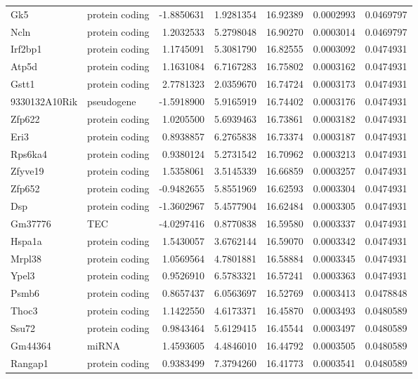 \documentclass[onehalf,12pt]{beavtex}
\begin{document}
\begin{longtable}{llrrrrr}
  Gk5 & protein coding & -1.8850631 & 1.9281354 & 16.92389 & 0.0002993 & 0.0469797\\
  Ncln & protein coding & 1.2032533 & 5.2798048 & 16.90270 & 0.0003014 & 0.0469797\\
  \addlinespace
  Irf2bp1 & protein coding & 1.1745091 & 5.3081790 & 16.82555 & 0.0003092 & 0.0474931\\
  Atp5d & protein coding & 1.1631084 & 6.7167283 & 16.75802 & 0.0003162 & 0.0474931\\
  Gstt1 & protein coding & 2.7781323 & 2.0359670 & 16.74724 & 0.0003173 & 0.0474931\\
  9330132A10Rik & pseudogene & -1.5918900 & 5.9165919 & 16.74402 & 0.0003176 & 0.0474931\\
  Zfp622 & protein coding & 1.0205500 & 5.6939463 & 16.73861 & 0.0003182 & 0.0474931\\
  \addlinespace
  Eri3 & protein coding & 0.8938857 & 6.2765838 & 16.73374 & 0.0003187 & 0.0474931\\
  Rps6ka4 & protein coding & 0.9380124 & 5.2731542 & 16.70962 & 0.0003213 & 0.0474931\\
  Zfyve19 & protein coding & 1.5358061 & 3.5145339 & 16.66859 & 0.0003257 & 0.0474931\\
  Zfp652 & protein coding & -0.9482655 & 5.8551969 & 16.62593 & 0.0003304 & 0.0474931\\
  Dsp & protein coding & -1.3602967 & 5.4577904 & 16.62484 & 0.0003305 & 0.0474931\\
  \addlinespace
  Gm37776 & TEC & -4.0297416 & 0.8770838 & 16.59580 & 0.0003337 & 0.0474931\\
  Hspa1a & protein coding & 1.5430057 & 3.6762144 & 16.59070 & 0.0003342 & 0.0474931\\
  Mrpl38 & protein coding & 1.0569564 & 4.7801881 & 16.58884 & 0.0003345 & 0.0474931\\
  Ypel3 & protein coding & 0.9526910 & 6.5783321 & 16.57241 & 0.0003363 & 0.0474931\\
  Psmb6 & protein coding & 0.8657437 & 6.0563697 & 16.52769 & 0.0003413 & 0.0478848\\
  \addlinespace
  Thoc3 & protein coding & 1.1422550 & 4.6173371 & 16.45870 & 0.0003493 & 0.0480589\\
  Ssu72 & protein coding & 0.9843464 & 5.6129415 & 16.45544 & 0.0003497 & 0.0480589\\
  Gm44364 & miRNA & 1.4593605 & 4.4846010 & 16.44792 & 0.0003505 & 0.0480589\\
  Rangap1 & protein coding & 0.9383499 & 7.3794260 & 16.41773 & 0.0003541 & 0.0480589\\

\end{longtable}
\end{document}
